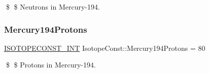 \$ \$ Neutrons in Mercury-\/194. \mbox{\label{group___isotope_const-_mercury-_hg194_ga9276e986bb5792d9e0ddb70a5b84a0b7}} 
\subsubsection{\texorpdfstring{Mercury194\+Protons}{Mercury194Protons}}
{\footnotesize\ttfamily \mbox{\hyperlink{group___isotope_const-_macros_ga5f18360b3e99483a35c32d789e62621c}{I\+S\+O\+T\+O\+P\+E\+C\+O\+N\+S\+T\+\_\+\+I\+NT}} Isotope\+Const\+::\+Mercury194\+Protons = 80}

\$ \$ Protons in Mercury-\/194. 